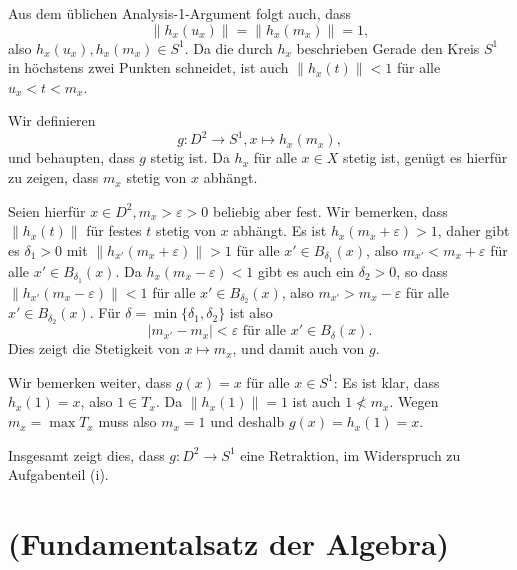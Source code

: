 \documentclass[a4paper,10pt]{article}
\begin{document}
Aus dem üblichen Analysis-1-Argument folgt auch, dass
\[
 \|h_x(u_x)\| = \|h_x(m_x)\| = 1,
\]
also $h_x(u_x), h_x(m_x) \in S^1$. Da die durch $h_x$ beschrieben Gerade den Kreis $S^1$ in höchstens zwei Punkten schneidet, ist auch $\|h_x(t)\| < 1$ für alle $u_x < t < m_x$.

Wir definieren
\[
 g : D^2 \to S^1, x \mapsto h_x(m_x),
\]
und behaupten, dass $g$ stetig ist. Da $h_x$ für alle $x \in X$ stetig ist, genügt es hierfür zu zeigen, dass $m_x$ stetig von $x$ abhängt.

Seien hierfür $x \in D^2, m_x > \varepsilon > 0$ beliebig aber fest. Wir bemerken, dass $\|h_x(t)\|$ für festes $t$ stetig von $x$ abhängt. Es ist $h_x(m_x+\varepsilon) > 1$, daher gibt es $\delta_1 > 0$ mit $\|h_{x'}(m_x+\varepsilon)\| > 1$ für alle $x' \in B_{\delta_1}(x)$, also $m_{x'} < m_x+\varepsilon$ für alle $x' \in B_{\delta_1}(x)$. Da $h_x(m_x-\varepsilon) < 1$ gibt es auch ein $\delta_2 > 0$, so dass $\|h_{x'}(m_x-\varepsilon)\| < 1$ für alle $x' \in B_{\delta_2}(x)$, also $m_{x'} > m_x-\varepsilon$ für alle $x' \in B_{\delta_2}(x)$. Für $\delta = \min\{\delta_1, \delta_2\}$ ist also
\[
 |m_{x'}-m_{x}| < \varepsilon \text{ für alle } x' \in B_\delta(x).
\]
Dies zeigt die Stetigkeit von $x \mapsto m_x$, und damit auch von $g$.

Wir bemerken weiter, dass $g(x) = x$ für alle $x \in S^1$: Es ist klar, dass $h_x(1) = x$, also $1 \in T_x$. Da $\|h_x(1)\| = 1$ ist auch $1 \nless m_x$. Wegen $m_x = \max T_x$ muss also $m_x = 1$ und deshalb $g(x) = h_x(1) = x$.

Insgesamt zeigt dies, dass $g : D^2 \to S^1$ eine Retraktion, im Widerspruch zu Aufgabenteil (i).










\section{(Fundamentalsatz der Algebra)}
\end{document}
